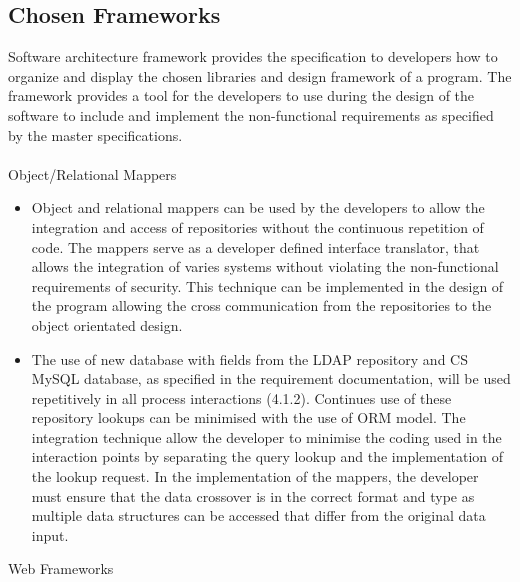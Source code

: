 \documentclass[12pt]{article}
\begin{document}
			\vspace{0.2in}
		
		
		\subsection{Chosen Frameworks}
				
							 Software architecture framework provides the specification to developers how to organize and display the chosen libraries and design framework of a program. The framework provides a tool for the developers to use during the design of the software to include and implement the non-functional requirements as specified by the master specifications.
							\\
							\\ Object/Relational Mappers
							\begin{itemize}
								 \item Object and relational mappers can be used by the developers to allow the integration and access of repositories without the continuous repetition of code. The mappers serve as a developer defined interface translator, that allows the integration of varies systems without violating the non-functional requirements of security. This technique can be implemented in the design of the program allowing the cross communication from the repositories to the object orientated design.
								
								\item The use of new database with fields from the LDAP repository and CS MySQL database, as specified in the requirement documentation, will be used repetitively in all process interactions (4.1.2). Continues use of these repository lookups can be minimised with the use of ORM model. The integration technique allow the developer to minimise the coding used in the interaction points by separating the query lookup and the implementation of the lookup request. In the implementation of the mappers, the developer must ensure that the data crossover is in the correct format and type as multiple data structures can be accessed that differ from the original data input.
							\end{itemize}
							 Web Frameworks
\end{document}
